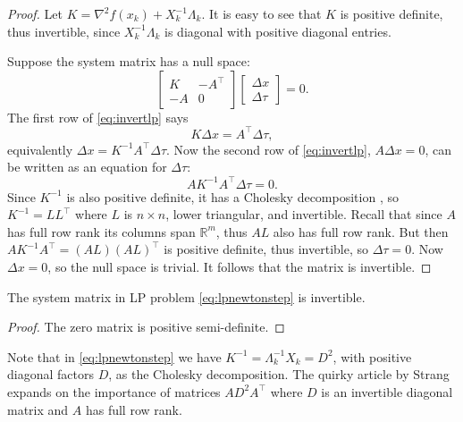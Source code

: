 \documentclass[11pt]{article}
\newcommand{\RR}{\mathbb{R}}
\newcommand{\grad}{\nabla}
\begin{document}
\begin{proof}  Let $K=\grad^2 f(x_k)+X_k^{-1}\Lambda_k$.  It is easy to see that $K$ is positive definite, thus invertible, since $X_k^{-1}\Lambda_k$ is diagonal with positive diagonal entries.

Suppose the system matrix has a null space:
\begin{equation}
\begin{bmatrix}
K   & -A^\top \\
-A  & 0
\end{bmatrix}
\begin{bmatrix}
\Delta x \\
\Delta \tau
\end{bmatrix}
= 0. \label{eq:invertlp}
\end{equation}
The first row of \eqref{eq:invertlp} says
    $$K \Delta x = A^\top \Delta\tau,$$
equivalently $\Delta x = K^{-1} A^\top \Delta \tau$.  Now the second row of \eqref{eq:invertlp}, $A\Delta x=0$, can be written as an equation for $\Delta\tau$:
    $$A K^{-1} A^\top \Delta \tau = 0.$$
Since $K^{-1}$ is also positive definite, it has a Cholesky decomposition \cite{TrefethenBau1997}, so $K^{-1}=LL^\top$ where $L$ is $n\times n$, lower triangular, and invertible.  Recall that since $A$ has full row rank its columns span $\RR^m$, thus $AL$ also has full row rank.  But then $A K^{-1} A^\top = (AL) (AL)^\top$ is positive definite, thus invertible, so $\Delta \tau=0$.  Now $\Delta x=0$, so the null space is trivial.  It follows that the matrix is invertible. \end{proof}

\begin{corollary} The system matrix in LP problem \eqref{eq:lpnewtonstep} is invertible.
\end{corollary}

\begin{proof}  The zero matrix is positive semi-definite.  \end{proof}

Note that in \eqref{eq:lpnewtonstep} we have $K^{-1}=\Lambda_k^{-1} X_k=D^2$, with positive diagonal factors $D$, as the Cholesky decomposition.  The quirky article by Strang \cite{Strang1987} expands on the importance of matrices $A D^2 A^\top$ where $D$ is an invertible diagonal matrix and $A$ has full row rank.
\end{document}
